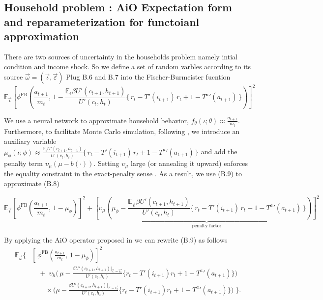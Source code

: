 \documentclass[11pt]{article}
\begin{document}
\subsection{Household problem : AiO Expectation form and reparameterization for functoianl approximation}
There are two sources of uncertainty in the households problem namely intial condition and income shock.
So we define a set of random varbles according to its source $\vec{\omega}=(\vec{\iota }, \vec{\varepsilon })$
Plug B.6 and B.7 into the Fischer-Burmeister fucntion
\begin{equation}
\mathbb{E}_{\vec{\iota}} \left[
\phi^{\text{FB}}\!\left(
\frac{a_{t+1}}{m_t},\,
1 - \frac{\mathbb{E}_{\epsilon} \beta U'(c_{t+1},h_{t+1})}{U'(c_t,h_t)}\Big\{\, r_t - T'(i_{t+1})\,r_t + 1 - {T^a}'(a_{t+1}) \,\Big\}
\right)
\right]^{2}
\end{equation}

We use a neural network to approximate household behavior,
$f_\theta(\iota;\theta) \approx \frac{a_{t+1}}{m_t}$. Furthermore, to
facilitate Monte Carlo simulation, following \cite{FiaccoMcCormick1968},
we introduce an auxiliary variable $\mu_\phi(\iota;\phi) \approx \frac{\mathbb{E}_{\epsilon} U'(c_{t+1},h_{t+1})}{U'(c_t,h_t)}\Big\{\, r_t - T'(i_{t+1})\,r_t + 1 - {T^a}'(a_{t+1}) \,\Big\}$ and add the
penalty term $\upsilon_{\mu}\!\left(\mu - b(\cdot)\right)$. Setting $\upsilon_{\mu}$
large (or annealing it upward) enforces the equality constraint in the
exact-penalty sense \cite{nocedal2006numerical}. As a result, we use (B.9) to approximate (B.8)


\begin{equation}
  \mathbb{E}_{\vec{\iota}}\left[\phi^{\text{FB}}\!\left(
  \frac{a_{t+1}}{m_t},\,
  1 - \mu_{\phi}
  \right) \right]^2 + 
  \underbrace{\left[ \upsilon_{\mu}\!\left(\mu_{\phi} - \frac{\mathbb{E}_{\vec{\epsilon}} \beta U'(c_{t+1},h_{t+1})}{U'(c_t,h_t)}\Big\{\, r_t - T'(i_{t+1})\,r_t + 1 - {T^a}'(a_{t+1}) \,\Big\}\right) \right]^2}_{\text{penalty factor}}
\end{equation}

By applying the AiO operator proposed in \cite{maliar2021deep} we can rewrite (B.9) as follows
\label{objfunc:AiO}
\begin{equation}
\begin{aligned}
\mathbb{E}_{\vec{\omega}} \Big\{ &
    \left[\,
      \phi^{\text{FB}}\!\left(
        \tfrac{a_{t+1}}{m_t},\,
        1 - \mu_{\phi}
      \right)
    \right]^2
    \\
    &\quad +\;
    \upsilon_h \Bigg(
      \,\mu - 
      \frac{\beta U'(c_{t+1},h_{t+1})|_{\vec{\epsilon}=\vec{\epsilon_1}}}
           {U'(c_t,h_t)}
      \Big\{ r_t - T'(i_{t+1}) r_t + 1 - {T^a}'(a_{t+1}) \Big\}
    \Bigg)
    \\
    &\qquad \times
    \Bigg(
      \mu - 
      \frac{\beta U'(c_{t+1},h_{t+1})|_{\vec{\epsilon}=\vec{\epsilon_2}}}
           {U'(c_t,h_t)}
      \Big\{ r_t - T'(i_{t+1}) r_t + 1 - {T^a}'(a_{t+1}) \Big\}
    \Bigg)
\;\Big\}.
\end{aligned}
\end{equation}
\end{document}
